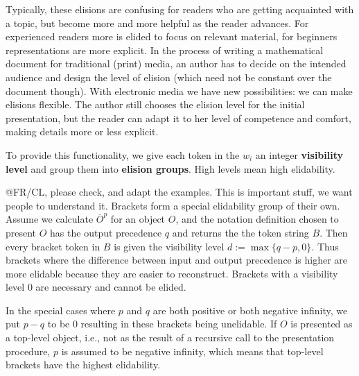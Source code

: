 \documentclass[a4paper]{article}
\def\pres#1#2{\overline{#1}^{#2}}
\def\defemph#1{{\bf{#1}}}
\begin{document}
Typically, these elisions are confusing for readers who are getting acquainted with a
topic, but become more and more helpful as the reader advances.  For experienced readers
more is elided to focus on relevant material, for beginners representations are more
explicit.  In the process of writing a mathematical document for traditional (print)
media, an author has to decide on the intended audience and design the level of elision
(which need not be constant over the document though). With electronic media we have new
possibilities: we can make elisions flexible. The author still chooses the elision level
for the initial presentation, but the reader can adapt it to her level of competence and
comfort, making details more or less explicit.

To provide this functionality, we give each token in the $w_i$ an integer
{\defemph{visibility level}} and group them into {\defemph{elision groups}}. High
levels mean high elidability. 

\begin{newpart}{@FR/CL, please check, and adapt the examples. This is important stuff, we
    want people to understand it.}
  Brackets form a special elidability group of their own. Assume we calculate $\pres{O}p$
  for an {\openmath} object $O$, and the notation definition chosen to present $O$ has the
  output precedence $q$ and returns the the token string $B$. Then every bracket token in
  $B$ is given the visibility level $d:=\max\{q-p,0\}$. Thus brackets where the
  difference between input and output precedence is higher are more elidable because they
  are easier to reconstruct. Brackets with a visibility level 0 are necessary and cannot
  be elided.

  In the special cases where $p$ and $q$ are both positive or both negative infinity, we
  put $p-q$ to be $0$ resulting in these brackets being unelidable. If $O$ is presented as
  a top-level object, i.e., not as the result of a recursive call to the presentation
  procedure, $p$ is assumed to be negative infinity, which means that top-level brackets
  have the highest elidability.
\end{newpart}
\end{document}
